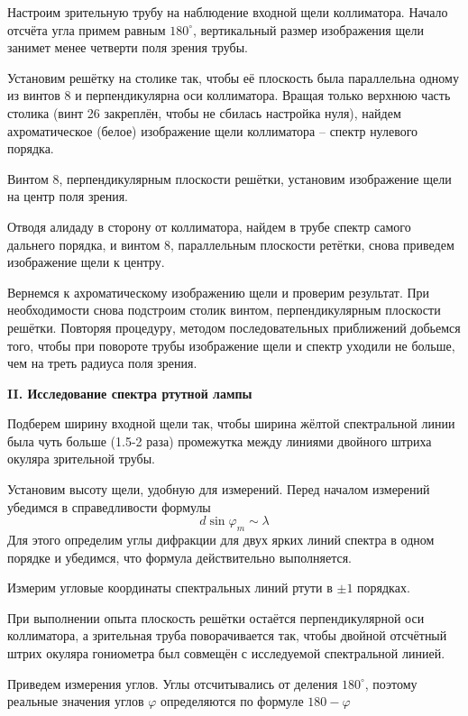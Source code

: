 \documentclass[14pt]{article}
\begin{document}
Настроим зрительную трубу на наблюдение входной щели коллиматора. Начало отсчёта угла примем равным $180^\circ$, вертикальный размер изображения щели занимет менее четверти поля зрения трубы.

Установим решётку на столике так, чтобы её плоскость была параллельна одному из винтов 8 и перпендикулярна оси коллиматора. Вращая только верхнюю часть столика (винт 26 закреплён, чтобы не сбилась настройка нуля), найдем ахроматическое (белое) изображение щели коллиматора -- спектр нулевого порядка.

Винтом 8, перпендикулярным плоскости решётки, установим изображение щели на центр поля зрения.

Отводя алидаду в сторону от коллиматора, найдем в трубе спектр самого дальнего порядка, и винтом 8, параллельным плоскости ретётки, снова приведем изображение щели к центру.

Вернемся к ахроматическому изображению щели и проверим результат. При необходимости снова подстроим столик винтом, перпендикулярным плоскости решётки. Повторяя процедуру, методом последовательных приближений добьемся того, чтобы при повороте трубы изображение щели и спектр уходили не больше, чем на треть радиуса поля зрения.

\vspace{1cm}
\textbf{II. Исследование спектра ртутной лампы}

Подберем ширину входной щели так, чтобы ширина жёлтой спектральной линии была чуть больше (1.5-2 раза) промежутка между линиями двойного штриха окуляра зрительной трубы.

Установим высоту щели, удобную для измерений. Перед началом измерений убедимся в справедливости формулы
$$
	d\sin\varphi_m \sim \lambda
$$
Для этого определим углы дифракции для двух ярких линий спектра в одном порядке и убедимся, что формула действительно выполняется.

Измерим угловые координаты спектральных линий ртути в $\pm 1$ порядках. 

При выполнении опыта плоскость решётки остаётся перпендикулярной оси коллиматора, а зрительная труба поворачивается так, чтобы двойной отсчётный штрих окуляра гониометра был совмещён с исследуемой спектральной линией.

Приведем измерения углов. Углы отсчитывались от деления $180^{\circ}$, поэтому реальные значения углов $\varphi$ определяются по формуле $180-\varphi$
\end{document}

